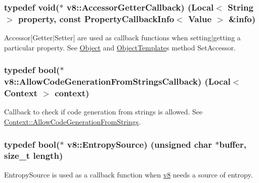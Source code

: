 \subsubsection[{\texorpdfstring{Accessor\+Getter\+Callback}{AccessorGetterCallback}}]{\setlength{\rightskip}{0pt plus 5cm}typedef void($\ast$ v8\+::\+Accessor\+Getter\+Callback) ({\bf Local}$<$ {\bf String} $>$ property, const {\bf Property\+Callback\+Info}$<$ {\bf Value} $>$ \&info)}\hypertarget{namespacev8_a722613c87061708a4f1aa050d095f868}{}\label{namespacev8_a722613c87061708a4f1aa050d095f868}
Accessor\mbox{[}Getter$\vert$\+Setter\mbox{]} are used as callback functions when setting$\vert$getting a particular property. See \hyperlink{classv8_1_1Object}{Object} and \hyperlink{classv8_1_1ObjectTemplate}{Object\+Template}\textquotesingle{}s method Set\+Accessor. 
\subsubsection[{\texorpdfstring{Allow\+Code\+Generation\+From\+Strings\+Callback}{AllowCodeGenerationFromStringsCallback}}]{\setlength{\rightskip}{0pt plus 5cm}typedef bool($\ast$ v8\+::\+Allow\+Code\+Generation\+From\+Strings\+Callback) ({\bf Local}$<$ {\bf Context} $>$ context)}\hypertarget{namespacev8_a521d909ec201742a1cb35d50a8e2a3c2}{}\label{namespacev8_a521d909ec201742a1cb35d50a8e2a3c2}
Callback to check if code generation from strings is allowed. See \hyperlink{classv8_1_1Context_a794ccc42113566f5d363f89c8b0d3c2c}{Context\+::\+Allow\+Code\+Generation\+From\+Strings}. 
\subsubsection[{\texorpdfstring{Entropy\+Source}{EntropySource}}]{\setlength{\rightskip}{0pt plus 5cm}typedef bool($\ast$ v8\+::\+Entropy\+Source) (unsigned char $\ast$buffer, size\+\_\+t length)}\hypertarget{namespacev8_ab699f4bbbb56350e6e915682e420fcdc}{}\label{namespacev8_ab699f4bbbb56350e6e915682e420fcdc}
Entropy\+Source is used as a callback function when \hyperlink{namespacev8}{v8} needs a source of entropy. 
